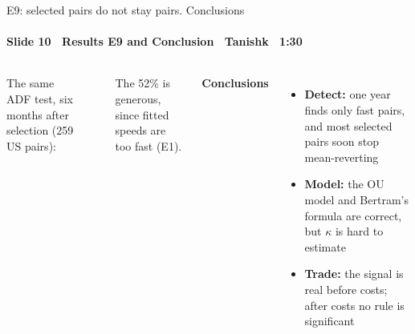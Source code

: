 \begin{frame}{E9: selected pairs do not stay pairs. Conclusions}
\framesubtitle{Slide 10 \textbullet\ Results E9 and Conclusion \textbullet\ Tanishk \textbullet\ 1:30}
\vspace{-2pt}
\begin{columns}[T,onlytextwidth]
  \small\raggedright
  The same ADF test, six months after selection (259 US pairs):\\[6pt]
  \centering
  \\[6pt]
  \footnotesize\raggedright
  The 52\% is generous, since fitted speeds are too fast (E1).
  \small\raggedright
  \textbf{\color{deckAccent}Conclusions}
  \begin{itemize}\setlength{\itemsep}{3pt}
    \item \textbf{Detect:} one year finds only fast pairs, and most selected pairs soon stop mean-reverting
    \item \textbf{Model:} the OU model and Bertram's formula are correct, but $\kappa$ is hard to estimate
    \item \textbf{Trade:} the signal is real before costs; after costs no rule is significant
  \end{itemize}
\end{columns}
\end{frame}
